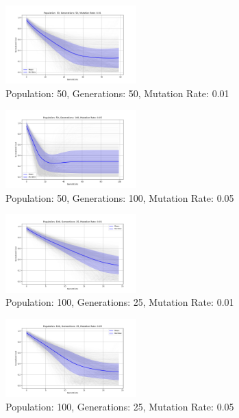 \documentclass[
]{article}
\begin{document}
    \begin{figure}[H]
        \centering
        \includegraphics[width=0.45\textwidth]{genetic_algorithm/appendix/Population_50_Generations_50_MutationRate_0.01}
        \caption{Population: 50, Generations: 50, Mutation Rate: 0.01}
        \label{fig:app_ga_50_50_01}
    \end{figure}


    \begin{figure}[H]
        \centering
        \includegraphics[width=0.45\textwidth]{genetic_algorithm/appendix/Population_50_Generations_100_MutationRate_0.05}
        \caption{Population: 50, Generations: 100, Mutation Rate: 0.05}
        \label{fig:app_ga_50_100_05}
    \end{figure}

    \begin{figure}[H]
        \centering
        \includegraphics[width=0.45\textwidth]{genetic_algorithm/appendix/Population_100_Generations_25_MutationRate_0.01}
        \caption{Population: 100, Generations: 25, Mutation Rate: 0.01}
        \label{fig:app_ga_100_25_01}
    \end{figure}

    \begin{figure}[H]
        \centering
        \includegraphics[width=0.45\textwidth]{genetic_algorithm/appendix/Population_100_Generations_25_MutationRate_0.05}
        \caption{Population: 100, Generations: 25, Mutation Rate: 0.05}
        \label{fig:app_ga_100_25_05}
    \end{figure}
\end{document}
